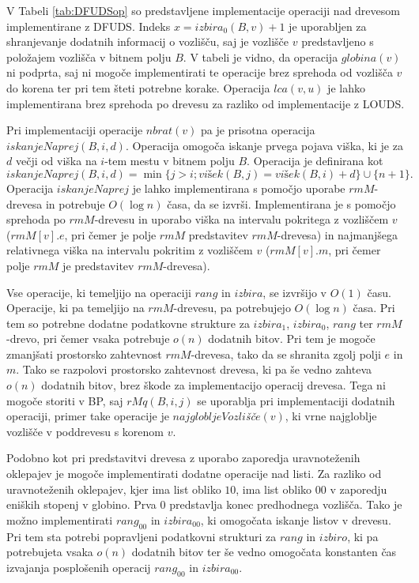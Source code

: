 V Tabeli \ref{tab:DFUDSop} so predstavljene implementacije operaciji nad drevesom implementirane z DFUDS. Indeks  $x=izbira_0(B,v)+1$ je uporabljen za shranjevanje dodatnih informacij o vozlišču, saj je vozlišče $v$ predstavljeno s položajem vozlišča v bitnem polju $B$. V tabeli je vidno, da operacija $globina(v)$ ni podprta, saj ni mogoče implementirati te operacije brez sprehoda od vozlišča $v$ do korena ter pri tem šteti potrebne korake. Operacija $lca(v,u)$ je lahko implementirana brez sprehoda po drevesu za razliko od implementacije z LOUDS.

Pri implementaciji operacije $nbrat(v)$ pa je prisotna operacija $iskanjeNaprej(B,i,d)$. Operacija omogoča iskanje prvega pojava viška, ki je za $d$ večji od viška na $i$-tem mestu v bitnem polju $B$. Operacija je definirana kot
$$
    iskanjeNaprej(B,i,d)=\min\{j>i; vi\textit{š}ek(B,j)=vi\textit{š}ek(B,i)+d\}\cup\{n+1\}.
$$
Operacija $iskanjeNaprej$ je lahko implementirana s pomočjo uporabe $rmM$-drevesa in potrebuje $O(\log{n})$ časa, da se izvrši. Implementirana je s pomočjo sprehoda po $rmM$-drevesu in uporabo viška na intervalu pokritega z vozliščem $v$ ($rmM[v].e$, pri čemer je polje $rmM$ predstavitev $rmM$-drevesa) in najmanjšega relativnega viška na intervalu pokritim z vozliščem $v$ ($rmM[v].m$, pri čemer polje $rmM$ je predstavitev $rmM$-drevesa).

Vse operacije, ki temeljijo na operaciji $rang$ in $izbira$, se izvršijo v $O(1)$ času. Operacije, ki pa temeljijo na $rmM$-drevesu, pa potrebujejo $O(\log{n})$ časa. Pri tem so potrebne dodatne podatkovne strukture za $izbira_1$, $izbira_0$, $rang$ ter $rmM$-drevo, pri čemer vsaka potrebuje $o(n)$ dodatnih bitov. Pri tem je mogoče zmanjšati prostorsko zahtevnost $rmM$-drevesa, tako da se shranita zgolj polji $e$ in $m$. Tako se razpolovi prostorsko zahtevnost drevesa, ki pa še vedno zahteva $o(n)$ dodatnih bitov, brez škode za implementacijo operacij drevesa. Tega ni mogoče storiti v BP, saj $rMq(B,i,j)$ se uporablja pri implementaciji dodatnih operaciji, primer take operacije je $najglobljeVozli$\textit{šč}$e(v)$, ki vrne najgloblje vozlišče v poddrevesu s korenom $v$.

Podobno kot pri predstavitvi drevesa z uporabo zaporedja uravnoteženih oklepajev je mogoče implementirati dodatne operacije nad listi. Za razliko od uravnoteženih oklepajev, kjer ima list obliko $10$, ima list obliko $00$ v zaporedju eniških stopenj v globino. Prva $0$ predstavlja konec predhodnega vozlišča. Tako je možno implementirati $rang_{00}$ in $izbira_{00}$, ki omogočata iskanje listov v drevesu. Pri tem sta potrebi popravljeni podatkovni strukturi za $rang$ in $izbiro$, ki pa potrebujeta vsaka $o(n)$ dodatnih bitov ter  še vedno omogočata konstanten čas izvajanja posplošenih operacij $rang_{00}$ in $izbira_{00}$.  
